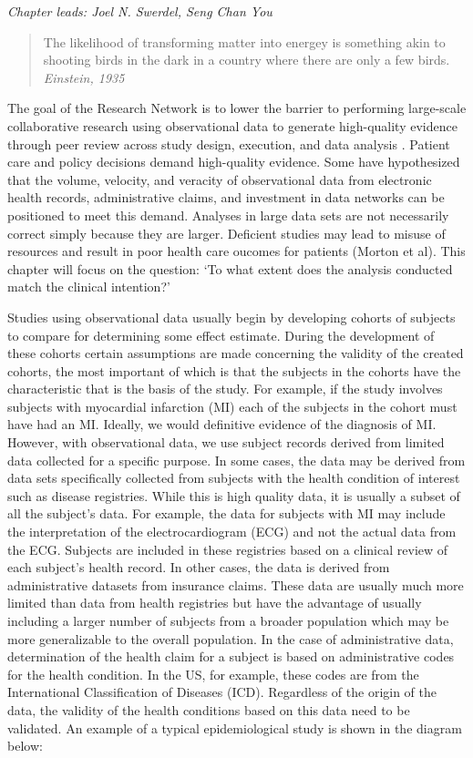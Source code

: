 \documentclass[11pt]{book}
\theoremstyle{definition}
\theoremstyle{definition}
\theoremstyle{definition}
\theoremstyle{remark}
\begin{document}
\emph{Chapter leads: Joel N. Swerdel, Seng Chan You}

\begin{quote}
The likelihood of transforming matter into energey is something akin to shooting birds in the dark in a country where there are only a few birds. \emph{Einstein, 1935}
\end{quote}

The goal of the Research Network is to lower the barrier to performing large-scale collaborative research using observational data to generate high-quality evidence through peer review across study design, execution, and data analysis \citep{Hripcsak2015}. Patient care and policy decisions demand high-quality evidence. Some have hypothesized that the volume, velocity, and veracity of observational data from electronic health records, administrative claims, and investment in data networks can be positioned to meet this demand. Analyses in large data sets are not necessarily correct simply because they are larger. Deficient studies may lead to misuse of resources and result in poor health care oucomes for patients (Morton et al). This chapter will focus on the question: `To what extent does the analysis conducted match the clinical intention?' 

Studies using observational data usually begin by developing cohorts of subjects to compare for determining some effect estimate. During the development of these cohorts certain assumptions are made concerning the validity of the created cohorts, the most important of which is that the subjects in the cohorts have the characteristic that is the basis of the study. For example, if the study involves subjects with myocardial infarction (MI) each of the subjects in the cohort must have had an MI. Ideally, we would definitive evidence of the diagnosis of MI. However, with observational data, we use subject records derived from limited data collected for a specific purpose. In some cases, the data may be derived from data sets specifically collected from subjects with the health condition of interest such as disease registries. While this is high quality data, it is usually a subset of all the subject's data. For example, the data for subjects with MI may include the interpretation of the electrocardiogram (ECG) and not the actual data from the ECG. Subjects are included in these registries based on a clinical review of each subject's health record. In other cases, the data is derived from administrative datasets from insurance claims. These data are usually much more limited than data from health registries but have the advantage of usually including a larger number of subjects from a broader population which may be more generalizable to the overall population. In the case of administrative data, determination of the health claim for a subject is based on administrative codes for the health condition. In the US, for example, these codes are from the International Classification of Diseases (ICD). Regardless of the origin of the data, the validity of the health conditions based on this data need to be validated.
An example of a typical epidemiological study is shown in the diagram below:  
\end{document}
